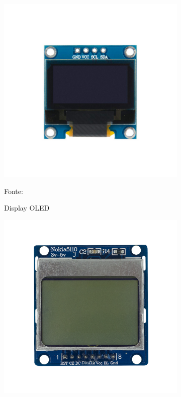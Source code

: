 \begin{figure}[h!]
\centering
  \begin{subfigure}[b]{0.3\textwidth}
  \centering
    \includegraphics[width=\textwidth]{figuras/display_oled.jpg}
    \caption{Display OLED} Fonte: \cite{FilipeFlop2019}
    \label{fig:display_oled}
  \end{subfigure}
  \begin{subfigure}[b]{0.3\textwidth}
  \centering
    \includegraphics[width=\textwidth]{figuras/display_nokia.png}

\end{subfigure}
\end{figure}

